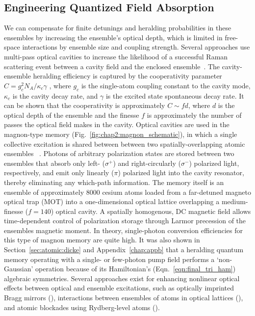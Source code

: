 \documentclass[aps,twocolumn,secnumarabic,amsmath,amssymb,pra,groupedaddress,
showpacs, showkeys]{revtex4-1}
\begin{document}
\subsection{Engineering Quantized Field Absorption\label{sec:atomic:dlcz}}

We can compensate for finite detunings and heralding probabilities in these
ensembles by increasing the ensemble's optical depth, which is limited in
free-space interactions by ensemble size and coupling strength. Several
approaches use multi-pass optical cavities to increase the likelihood of a
successful Raman scattering event between a cavity field and the enclosed
ensemble~\cite{PhysRevLett.92.123601, PhysRevLett.95.133601,
  PhysRevLett.98.190503,Thompson07072006,PhysRevLett.98.183601}. The
cavity-ensemble heralding efficiency is captured by the cooperativity parameter
$C=g_c^2 N_A/\kappa_c \gamma$ , where $g_c$ is the single-atom coupling
constant to the cavity mode, $\kappa_c$ is the cavity decay rate, and $\gamma$
is the excited state spontaneous decay rate. It can be shown that the
cooperativity is approximately $C\sim fd$, where $d$ is the optical depth of
the ensemble and the finesse ${f}$ is approximately the number of passes the
optical field makes in the cavity. Optical cavities are used in the magnon-type
memory (Fig.~\ref{fig:chap2:magnon_schematic}), in which a single collective
excitation is shared between between two spatially-overlapping atomic ensembles
~\cite{PhysRevLett.103.043601}. Photons of arbitrary polarization states are
stored between two ensembles that absorb only left- ($\sigma^{+}$) and
right-circularly ($\sigma^{-}$) polarized light, respectively, and emit only
linearly ($\pi$) polarized light into the cavity resonator, thereby eliminating
any which-path information. The memory itself is an ensemble of approximately
8000 cesium atoms loaded from a far-detuned magneto optical trap (MOT) into a
one-dimensional optical lattice overlapping a medium-finesse ($f=140$) optical
cavity. A spatially homogenous, DC magnetic field allows time-dependent control
of polarization storage through Larmor precession of the ensembles magnetic
moment. In theory, single-photon conversion efficiencies for this type of
magnon memory are quite high. It was also shown in
Section~\ref{sec:atomic:dicke} and Appendix~\ref{chap:appb} that a heralding
quantum memory operating with a single- or few-photon pump field performs a
`non-Gaussian' operation because of its Hamiltonian's
(Eqn.~\ref{eqn:final_tri_ham}) algebraic symmetries. Several approaches exist
for enhancing nonlinear optical effects between optical and ensemble
excitations, such as optically imprinted Bragg mirrors
(\cite{PhysRevLett.89.143602, nature02176}), interactions between ensembles of
atoms in optical lattices (\cite{PhysRevLett.100.063601}), and atomic blockades
using Rydberg-level atoms (\cite{PhysRevLett.87.037901}). 
\end{document}

